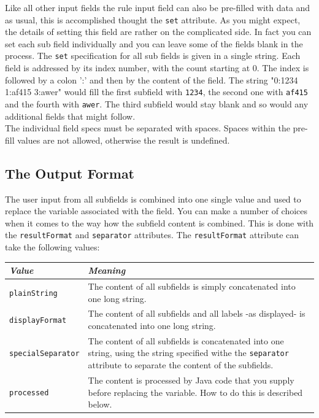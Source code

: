 Like all other input fields the rule input field can also be pre-filled
with data and as usual, this is accomplished thought the \texttt{set}
attribute. As you might expect, the details of setting this field are
rather on the complicated side. In fact you can set each sub field
individually and you can leave some of the fields blank in the process.
The \texttt{set} specification for all sub fields is given in a single
string. Each field is addressed by its index number, with the count
starting at 0. The index is followed by a colon ':' and then by the
content of the field. The string "0:1234 1:af415 3:awer" would fill the
first subfield with \texttt{1234}, the second one with \texttt{af415} and
the fourth with \texttt{awer}. The third subfield would stay blank
and so would any additional fields that might follow.\\

The individual field specs must be separated with spaces. Spaces within
the pre-fill values are not allowed, otherwise the result is undefined.\\

\subsection{The Output Format}

The user input from all subfields is combined into one single value and
used to replace the variable associated with the field. You can make a
number of choices when it comes to the way how the subfield content is
combined. This is done with the \texttt{resultFormat} and
\texttt{separator} attributes. The \texttt{resultFormat} attribute can
take the following values:\\

\begin{center}
\begin{tabularx}{\textwidth}{|l|X|}
\hline \textit{Value} & \textit{Meaning}\\
\hline \texttt{plainString} & The content of all subfields is simply concatenated into one long string.\\
\hline \texttt{displayFormat} & The content of all subfields and all labels -as displayed- is concatenated into one long string.\\
\hline \texttt{specialSeparator} & The content of all subfields is concatenated into one string, using the string specified withe the \texttt{separator} attribute to separate the content of the subfields.\\
\hline \texttt{processed} & The content is processed by Java code that you supply before replacing the variable. How to do this is described below.\\
\hline
\end{tabularx}\
\end{center}

